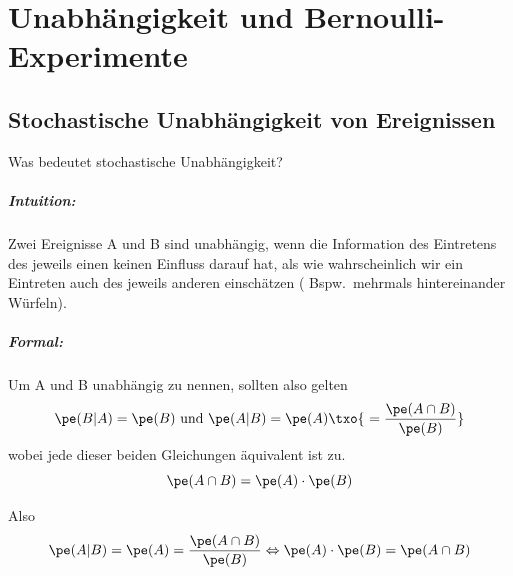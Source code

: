 


\chapter{Unabhängigkeit und Bernoulli-Experimente }\label{ch:unabhangigkeit-und-bernoulli-experimente-index{bernoulli-experiment}}
\section{Stochastische Unabhängigkeit von Ereignissen}\label{sec:stochastische-unabhangigkeit-von-ereignissen}
Was bedeutet stochastische Unabhängigkeit?

\paragraph{Intuition:} Zwei Ereignisse A und B sind unabhängig, wenn die Information des Eintretens des jeweils
einen keinen Einfluss darauf hat, als wie wahrscheinlich wir ein Eintreten auch des jeweils anderen einschätzen (
Bspw.\ mehrmals hintereinander Würfeln).

\paragraph{Formal:} Um A und B unabhängig zu nennen, sollten also gelten 
\[
    \pe(B|A) = \pe(B)
    \text{ und }
    \pe(A|B) = \pe(A) \txo{\ = \frac{\pe(A \cap B)}{\pe(B)}}
\]
wobei jede dieser beiden Gleichungen äquivalent ist zu.
\[
    \pe(A \cap B) = \pe(A) \cdot \pe(B)
\]

Also
\[
    \pe(A|B) = \pe(A)  = \frac{\pe(A \cap B)}{\pe(B)} \Leftrightarrow \pe(A) \cdot \pe(B) = \pe(A \cap B)
\]



